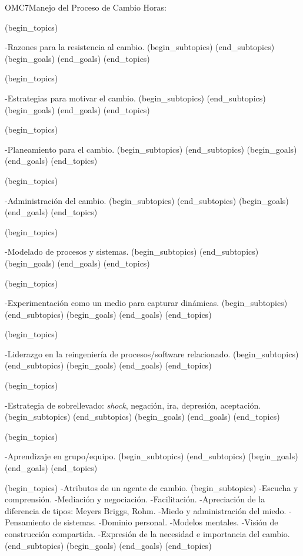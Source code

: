 \begin{BKL2}{OMC7}{Manejo del Proceso de Cambio}
Horas:

 

(begin_topics)

-Razones para la resistencia al cambio.
(begin_subtopics)
(end_subtopics)
(begin_goals)
(end_goals)
(end_topics)

 

(begin_topics)

-Estrategias para motivar el cambio.
(begin_subtopics)
(end_subtopics)
(begin_goals)
(end_goals)
(end_topics)

 

(begin_topics)

-Planeamiento para el cambio.
(begin_subtopics)
(end_subtopics)
(begin_goals)
(end_goals)
(end_topics)

 

(begin_topics)

-Administración del cambio.
(begin_subtopics)
(end_subtopics)
(begin_goals)
(end_goals)
(end_topics)

 

(begin_topics)

-Modelado de procesos y sistemas.
(begin_subtopics)
(end_subtopics)
(begin_goals)
(end_goals)
(end_topics)

 

(begin_topics)

-Experimentación como un medio para capturar dinámicas.
(begin_subtopics)
(end_subtopics)
(begin_goals)
(end_goals)
(end_topics)

 

(begin_topics)

-Liderazgo en la reingeniería de procesos/software relacionado.
(begin_subtopics)
(end_subtopics)
(begin_goals)
(end_goals)
(end_topics)

 

(begin_topics)

-Estrategia de sobrellevado: {\it shock}, negación, ira, depresión, aceptación.
(begin_subtopics)
(end_subtopics)
(begin_goals)
(end_goals)
(end_topics)

 

(begin_topics)

-Aprendizaje en grupo/equipo.
(begin_subtopics)
(end_subtopics)
(begin_goals)
(end_goals)
(end_topics)


(begin_topics)
-Atributos de un agente de cambio.
(begin_subtopics)
-Escucha y comprensión.
-Mediación y negociación.
-Facilitación.
-Apreciación de la diferencia de tipos: Meyers Briggs, Rohm.
-Miedo y administración del miedo.
-Pensamiento de sistemas.
-Dominio personal.
-Modelos mentales.
-Visión de construcción compartida.
-Expresión de la necesidad e importancia del cambio.
(end_subtopics)
(begin_goals)
(end_goals)
(end_topics)


\end{BKL2}
